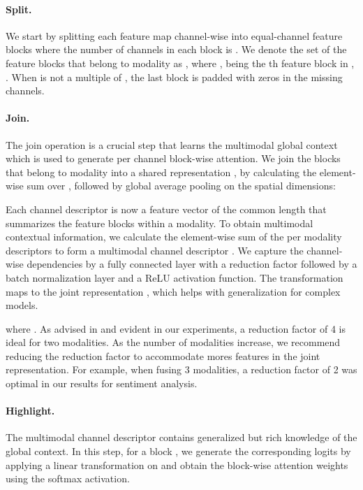 \documentclass[10pt,twocolumn,letterpaper]{article}
\begin{document}
\paragraph{Split.}
We start by splitting each feature map channel-wise into equal-channel feature blocks where the number of channels in each block is . We denote the set of the feature blocks that belong to modality  as , where ,  being the th feature block in , . When  is not a multiple of , the last block is padded with zeros in the missing channels. 

\paragraph{Join.}
The join operation is a crucial step that learns the multimodal global context which is used to generate per channel block-wise attention. We join the blocks that belong to modality  into a shared representation , by calculating the element-wise sum  over , followed by global average pooling on the spatial dimensions: 

Each channel descriptor is now a feature vector of the common length  that summarizes the feature blocks within a modality. To obtain multimodal contextual information, we calculate the element-wise sum of the per modality descriptors  to form a multimodal channel descriptor .
We capture the channel-wise dependencies by a fully connected layer with a reduction factor  followed by a batch normalization layer and a ReLU activation function. The transformation maps  to the joint representation ,  which helps with generalization for complex models. 

where . As advised in \cite{joze2020mmtm} and evident in our experiments, a reduction factor of 4 is ideal for two modalities. As the number of modalities increase, we recommend reducing the reduction factor to accommodate mores features in the joint representation. For example, when fusing 3 modalities, a reduction factor of 2 was optimal in our results for sentiment analysis.

\paragraph{Highlight.}
The multimodal channel descriptor contains generalized but rich knowledge of the global context. In this step, for a block , we generate the corresponding logits  by applying a linear transformation on  and obtain the block-wise attention weights  using the softmax activation. 
\end{document}
